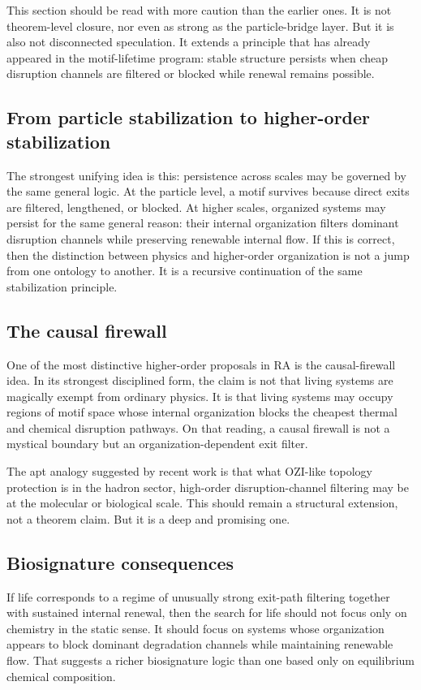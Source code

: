 \documentclass[11pt]{article}
\begin{document}
This section should be read with more caution than the earlier ones. It is not theorem-level closure, nor even as strong as the particle-bridge layer. But it is also not disconnected speculation. It extends a principle that has already appeared in the motif-lifetime program: stable structure persists when cheap disruption channels are filtered or blocked while renewal remains possible.

\subsection{From particle stabilization to higher-order stabilization}
The strongest unifying idea is this: persistence across scales may be governed by the same general logic. At the particle level, a motif survives because direct exits are filtered, lengthened, or blocked. At higher scales, organized systems may persist for the same general reason: their internal organization filters dominant disruption channels while preserving renewable internal flow. If this is correct, then the distinction between physics and higher-order organization is not a jump from one ontology to another. It is a recursive continuation of the same stabilization principle.

\subsection{The causal firewall}
One of the most distinctive higher-order proposals in RA is the causal-firewall idea. In its strongest disciplined form, the claim is not that living systems are magically exempt from ordinary physics. It is that living systems may occupy regions of motif space whose internal organization blocks the cheapest thermal and chemical disruption pathways. On that reading, a causal firewall is not a mystical boundary but an organization-dependent exit filter.

The apt analogy suggested by recent work is that what OZI-like topology protection is in the hadron sector, high-order disruption-channel filtering may be at the molecular or biological scale. This should remain a structural extension, not a theorem claim. But it is a deep and promising one.

\subsection{Biosignature consequences}
If life corresponds to a regime of unusually strong exit-path filtering together with sustained internal renewal, then the search for life should not focus only on chemistry in the static sense. It should focus on systems whose organization appears to block dominant degradation channels while maintaining renewable flow. That suggests a richer biosignature logic than one based only on equilibrium chemical composition.
\end{document}

